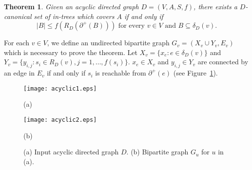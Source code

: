 \documentclass[11pt]{article}
\newcounter{ni}
\theoremstyle{plain}
\newtheorem{theorem}{Theorem}[section]
\newcommand{\eop}{\hfill \usebox{\ProofSym}}
\newenvironment{proof}{\noindent {\it Proof.}}{\eop\par\vspace{0.3cm}}
\begin{document}
\begin{theorem} \label{main_theorem_acyclic}
Given an acyclic directed graph  $D=(V,A,S,f)$, 
there exists a $D$-canonical set of in-trees which covers $A$
 if and only if 
\begin{equation} \label{eq1:main_theorem_acyclic}
|B| \le f(R_D(\partial^+(B))) \mbox{ for every } v \in V  \mbox{ and
 } B\subseteq \delta_D(v). 
\end{equation}
\end{theorem}
\begin{proof}
For each $v \in V$, we define an undirected bipartite graph
$G_v=(X_v\cup Y_v, E_v)$ which is necessary to prove the theorem. 
Let $X_v=\{x_e\colon e \in \delta_D(v)\}$ and 
$Y_v=\{y_{i,j}\colon s_i \in R_D(v), j=1,\ldots,f(s_i)\}$. 
$x_e \in X_v$ and $y_{i,j} \in Y_v$ are connected by an edge in $E_v$ if and only if $s_i$
is reachable from $\partial^+(e)$ (see Figure~\ref{fig:acyclic}). 

\begin{figure}[h]
\begin{minipage}{0.5\hsize}
\begin{center}
\texttt{[image: acyclic1.eps]}
\par(a)
\end{center}
\end{minipage}
\begin{minipage}{0.5\hsize}
\begin{center}
\texttt{[image: acyclic2.eps]}
\par(b)
\end{center}
\end{minipage}
\caption{\small (a) Input acyclic directed graph $D$. (b) Bipartite graph $G_u$
 for $u$ in (a).}
\label{fig:acyclic}
\end{figure}


\end{proof}
\end{document}
